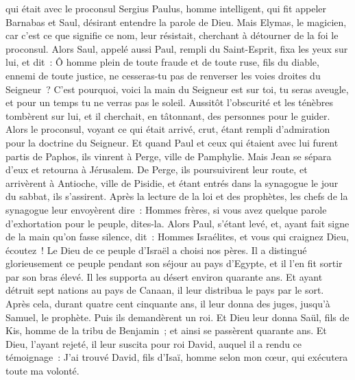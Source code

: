 \begin{multicols}{2}
qui était avec le proconsul Sergius Paulus, homme intelligent, qui fit appeler Barnabas et Saul, désirant entendre la parole de Dieu.
Mais Elymas, le magicien, car c'est ce que signifie ce nom, leur résistait, cherchant à détourner de la foi le proconsul.
Alors Saul, appelé aussi Paul, rempli du Saint-Esprit, fixa les yeux sur lui, et dit~:
Ô homme plein de toute fraude et de toute ruse, fils du diable, ennemi de toute justice, ne cesseras-tu pas de renverser les voies droites du Seigneur~?
C'est pourquoi, voici la main du Seigneur est sur toi, tu seras aveugle, et pour un temps tu ne verras pas le soleil. Aussitôt l'obscurité et les ténèbres tombèrent sur lui, et il cherchait, en tâtonnant, des personnes pour le guider.
Alors le proconsul, voyant ce qui était arrivé, crut, étant rempli d'admiration pour la doctrine du Seigneur.
Et quand Paul et ceux qui étaient avec lui furent partis de Paphos, ils vinrent à Perge, ville de Pamphylie. Mais Jean se sépara d'eux et retourna à Jérusalem.
De Perge, ils poursuivirent leur route, et arrivèrent à Antioche, ville de Pisidie, et étant entrés dans la synagogue le jour du sabbat, ils s'assirent.
Après la lecture de la loi et des prophètes, les chefs de la synagogue leur envoyèrent dire~: Hommes frères, si vous avez quelque parole d'exhortation pour le peuple, dites-la.
Alors Paul, s'étant levé, et, ayant fait signe de la main qu'on fasse silence, dit~: Hommes Israélites, et vous qui craignez Dieu, écoutez~!
Le Dieu de ce peuple d'Israël a choisi nos pères. Il a distingué glorieusement ce peuple pendant son séjour au pays d'Egypte, et il l'en fit sortir par son bras élevé.
Il les supporta au désert environ quarante ans.
Et ayant détruit sept nations au pays de Canaan, il leur distribua le pays par le sort.
Après cela, durant quatre cent cinquante ans, il leur donna des juges, jusqu'à Samuel, le prophète.
Puis ils demandèrent un roi. Et Dieu leur donna Saül, fils de Kis, homme de la tribu de Benjamin~; et ainsi se passèrent quarante ans.
Et Dieu, l'ayant rejeté, il leur suscita pour roi David, auquel il a rendu ce témoignage~: J'ai trouvé David, fils d'Isaï, homme selon mon cœur, qui exécutera toute ma volonté.

\end{multicols}
